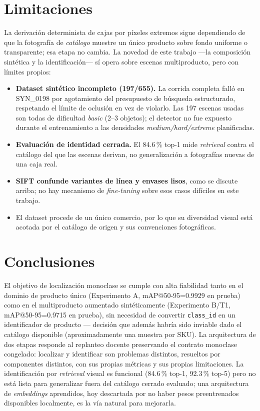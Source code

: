 \documentclass[10pt,a4paper]{article}
\begin{document}
\section{Limitaciones}

La derivación determinista de cajas por píxeles extremos sigue dependiendo de
que la fotografía de \emph{catálogo} muestre un único producto sobre fondo
uniforme o transparente; esa etapa no cambia. La novedad de este trabajo ---la
composición sintética y la identificación--- sí opera sobre escenas
multiproducto, pero con límites propios:

\begin{itemize}
  \item \textbf{Dataset sintético incompleto (197/655).} La corrida completa
        falló en SYN\_0198 por agotamiento del presupuesto de búsqueda
        estructurado, respetando el límite de oclusión en vez de violarlo.
        Las 197 escenas usadas son todas de dificultad \emph{basic}
        (2--3 objetos); el detector no fue expuesto durante el entrenamiento
        a las densidades \emph{medium/hard/extreme} planificadas.
  \item \textbf{Evaluación de identidad cerrada.} El 84.6\,\% top-1 mide
        \emph{retrieval} contra el catálogo del que las escenas derivan, no
        generalización a fotografías nuevas de una caja real.
  \item \textbf{SIFT confunde variantes de línea y envases lisos}, como se
        discute arriba; no hay mecanismo de \emph{fine-tuning} sobre esos
        casos difíciles en este trabajo.
  \item El dataset procede de un único comercio, por lo que su diversidad
        visual está acotada por el catálogo de origen y sus convenciones
        fotográficas.
\end{itemize}

\section{Conclusiones}

El objetivo de localización monoclase se cumple con alta fiabilidad tanto en
el dominio de producto único (Experimento A, mAP@50-95=0.9929 en prueba) como
en el multiproducto aumentado sintéticamente (Experimento B/T1,
mAP@50-95=0.9715 en prueba), sin necesidad de convertir \texttt{class\_id} en
un identificador de producto --- decisión que además habría sido inviable
dado el catálogo disponible (aproximadamente una muestra por SKU). La
arquitectura de dos etapas responde al replanteo docente preservando el
contrato monoclase congelado: localizar y identificar son problemas
distintos, resueltos por componentes distintos, con sus propias métricas y
sus propias limitaciones. La identificación por \emph{retrieval} visual es
funcional (84.6\,\% top-1, 92.3\,\% top-5) pero no está lista para
generalizar fuera del catálogo cerrado evaluado; una arquitectura de
\emph{embeddings} aprendidos, hoy descartada por no haber pesos
preentrenados disponibles localmente, es la vía natural para mejorarla.
\end{document}
